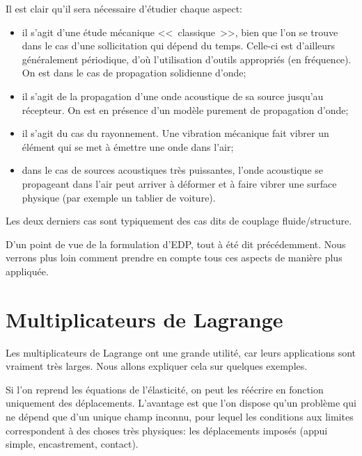 \medskip
Il est clair qu'il sera nécessaire d'étudier chaque aspect:
\begin{itemize}
\item {} il s'agit d'une étude mécanique <<~classique~>>, bien que l'on se trouve
	dans le cas d'une sollicitation qui dépend du temps. Celle-ci est d'ailleurs généralement
	périodique, d'où l'utilisation d'outils appropriés (en fréquence). On est dans
	le cas de propagation solidienne d'onde;
  \item {} il s'agit de la propagation d'une onde acoustique de sa source
	jusqu'au récepteur. On est en présence d'un modèle purement de propagation
	d'onde;
  \item {} il s'agit du cas du rayonnement. Une vibration mécanique fait
	vibrer un élément qui se met à émettre une onde dans l'air;
  \item {} dans le cas de sources acoustiques très puissantes, l'onde
	acoustique se propageant dans l'air peut arriver à déformer et à faire 
	vibrer une surface physique (par exemple un tablier de voiture).
\end{itemize}
Les deux derniers cas sont typiquement des cas dits de couplage fluide/structure.

\medskip
D'un point de vue de la formulation d'EDP, tout à été dit précédemment.
Nous verrons plus loin comment prendre en compte tous ces aspects de manière
plus appliquée.

\medskip
\section{Multiplicateurs de Lagrange}

Les multiplicateurs de Lagrange ont une grande utilité, car leurs applications sont
vraiment très larges.
Nous allons expliquer cela sur quelques exemples.

\medskip
Si l'on reprend les équations de l'élasticité, on peut les réécrire en fonction
uniquement des déplacements.
L'avantage est que l'on dispose qu'un problème qui ne dépend que d'un unique
champ inconnu, pour lequel les conditions aux limites correspondent à des choses 
très physiques: les déplacements imposés (appui simple, encastrement, contact).

